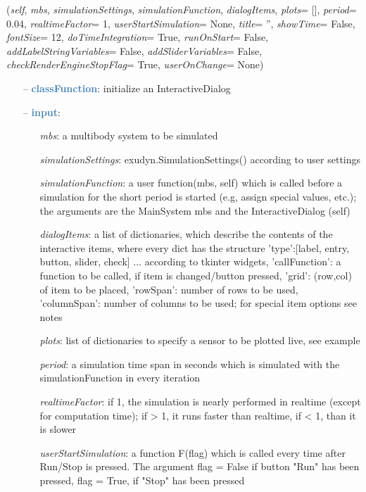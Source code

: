 \begin{itemize}[leftmargin=1.4cm]
\begin{itemize}[leftmargin=1.4cm]
\begin{itemize}[leftmargin=0.5cm]
\begin{itemize}[leftmargin=1.4cm]
\begin{itemize}[leftmargin=1.4cm]
\begin{itemize}[leftmargin=0.5cm]
\begin{itemize}[leftmargin=1.4cm]
\begin{itemize}[leftmargin=0.5cm]
\begin{itemize}[leftmargin=1.4cm]
\begin{itemize}[leftmargin=1.4cm]
\begin{flushleft}
({\it self}, {\it mbs}, {\it simulationSettings}, {\it simulationFunction}, {\it dialogItems}, {\it plots}= [], {\it period}= 0.04, {\it realtimeFactor}= 1, {\it userStartSimulation}= None, {\it title}= '', {\it showTime}= False, {\it fontSize}= 12, {\it doTimeIntegration}= True, {\it runOnStart}= False, {\it addLabelStringVariables}= False, {\it addSliderVariables}= False, {\it checkRenderEngineStopFlag}= True, {\it userOnChange}= None)
\end{flushleft}
\setlength{\itemindent}{0.7cm}
\begin{itemize}[leftmargin=0.7cm]
  \item[--]  \textcolor{steelblue}{\bf classFunction}: initialize an InteractiveDialog  \item[--]  \textcolor{steelblue}{\bf input}: \vspace{-6pt}
  \begin{itemize}[leftmargin=1.2cm]
\setlength{\itemindent}{-0.7cm}
    \item[] {\it mbs}: a multibody system to be simulated
    \item[] {\it   simulationSettings}: exudyn.SimulationSettings() according to user settings
    \item[] {\it   simulationFunction}: a user function(mbs, self) which is called before a simulation for the short period is started (e.g, assign special values, etc.); the arguments are the MainSystem mbs and the InteractiveDialog (self)
    \item[] {\it   dialogItems}: a list of dictionaries, which describe the contents of the interactive items, where every dict has the structure {'type':[label, entry, button, slider, check] ... according to tkinter widgets, 'callFunction': a function to be called, if item is changed/button pressed, 'grid': (row,col) of item to be placed, 'rowSpan': number of rows to be used, 'columnSpan': number of columns to be used; for special item options see notes}
    \item[] {\it   plots}: list of dictionaries to specify a sensor to be plotted live, see example
    \item[] {\it   period}: a simulation time span in seconds which is simulated with the simulationFunction in every iteration
    \item[] {\it   realtimeFactor}: if 1, the simulation is nearly performed in realtime (except for computation time); if > 1, it runs faster than realtime, if < 1, than it is slower
    \item[] {\it   userStartSimulation}: a function F(flag) which is called every time after Run/Stop is pressed. The argument flag = False if button "Run" has been pressed, flag = True, if "Stop" has been pressed

\end{itemize}
\end{itemize}
\end{itemize}
\end{itemize}
\end{itemize}
\end{itemize}
\end{itemize}
\end{itemize}
\end{itemize}
\end{itemize}
\end{itemize}
\end{itemize}
